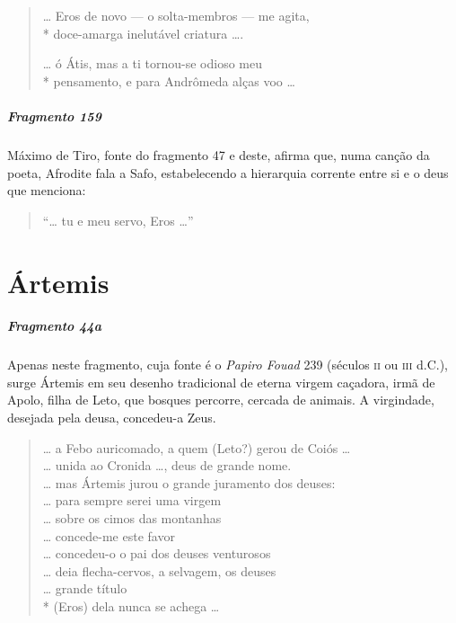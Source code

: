 \begin{verse}
\ldots{} Eros de novo --- o solta-membros --- me agita,\\*
doce-amarga inelutável criatura \ldots{}.

\ldots{} ó Átis, mas a ti tornou-se odioso meu\\*
pensamento, e para Andrômeda alças voo \ldots{}
\end{verse}

\paragraph{Fragmento 159}

{\small Máximo de Tiro, fonte do fragmento 47 e deste, afirma que, numa canção da poeta,
Afrodite fala a Safo, estabelecendo a hierarquia corrente entre si e o deus que
menciona:}

\begin{verse}
“\ldots{} tu e meu servo, Eros \ldots{}”
\end{verse}


\chapter{Ártemis}

\paragraph{Fragmento 44a}

{\small Apenas neste fragmento, cuja fonte é o \textit{Papiro Fouad }239 (séculos \textsc{ii} ou
\textsc{iii} d.C.), surge Ártemis em seu desenho tradicional de eterna virgem caçadora,
irmã de Apolo, filha de Leto, que bosques percorre, cercada de animais. A
virgindade, desejada pela deusa, concedeu-a Zeus.}

\begin{verse}
\ldots{} a Febo auricomado, a quem (Leto?) gerou de Coiós \ldots{}\\
\ldots{} unida ao Cronida \ldots{}, deus de grande nome.\\
\ldots{} mas Ártemis jurou o grande juramento dos deuses:\\
\ldots{} para sempre serei uma virgem\\
\ldots{} sobre os cimos das montanhas\\
\ldots{} concede-me este favor\\
\ldots{} concedeu-o o pai dos deuses venturosos\\
\ldots{} deia flecha-cervos, a selvagem, os deuses\\
\ldots{} grande título\\*
(Eros) dela nunca se achega \ldots{}
\end{verse}


